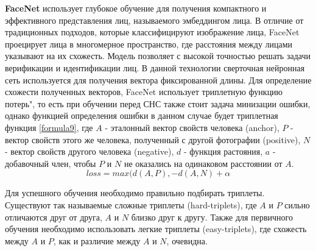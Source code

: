 \textbf{FaceNet} использует глубокое обучение для получения компактного и эффективного представления лиц, называемого эмбеддингом лица. В отличие от традиционных подходов, которые классифицируют изображение лица, FaceNet проецирует лица в многомерное пространство, где расстояния между лицами указывают на их схожесть. Модель позволяет с высокой точностью решать задачи верификации и идентификации лиц. В данной технологии сверточная нейронная сеть используется для получения вектора фиксированной длины. Для определение схожести полученных векторов, FaceNet использует триплетную функцию потерь", то есть при обучении перед СНС также стоит задача минизации ошибки, однако функцией определения ошибки в данном случае будет триплетная функция \ref{formula9}, где $A$ - эталонный вектор свойств человека (anchor), $P$ - вектор свойств этого же человека, полученный с другой фотографии (positive), $N$ - вектор свойств другого человека (negative), $d$ - функция растояния, $a$ - добавочный член, чтобы $P$ и $N$ не оказались на одинаковом расстоянии от $A$.
\begin{equation}
loss = max(d(A, P), - d(A, N) + \alpha
\label{formula9}
\end{equation}

Для успешного обучения необходимо правильно подбирать триплеты. Существуют так называемые сложные триплеты (hard-triplets), где $A$ и $P$ сильно отличаются друг от друга, $A$ и $N$ близко друг к другу. Также для первичного обучения необходимо использовать легкие триплеты (easy-triplets), где схожесть между $A$ и $P$, как и различие между $A$ и $N$, очевидна.



\renewcommand\bibname{СПИСОК ИСПОЛЬЗОВАННЫХ ИСТОЧНИКОВ}





